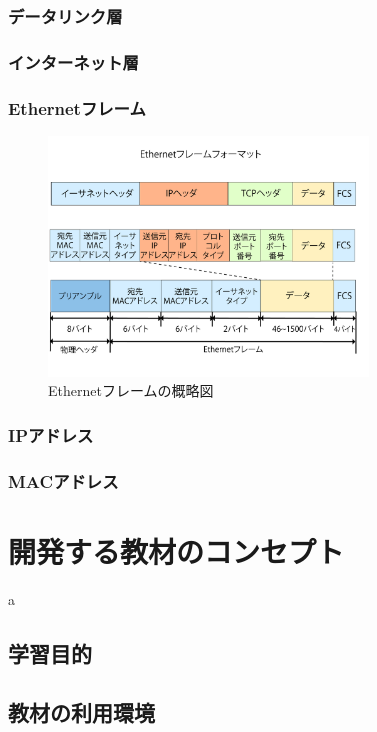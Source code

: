 \documentclass[12pt,a4j,titlepage]{ltjsarticle}
\begin{document}
\subsubsection{データリンク層}
\subsubsection{インターネット層}

\subsubsection{Ethernetフレーム}
\begin{figure}[h]
\centering
\includegraphics[clip,width=85mm]{figures/ethernet.pdf}
\caption[Ethernetフレームの概略図]{Ethernetフレームの概略図\linebreak}
\label{fig:ether}
\end{figure}

\subsubsection{IPアドレス}
\subsubsection{MACアドレス}

\clearpage

\section{開発する教材のコンセプト}%
a
\subsection{学習目的}
\subsection{教材の利用環境}
\end{document}
